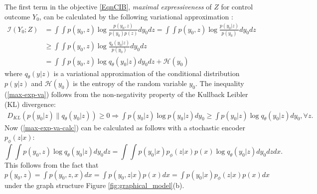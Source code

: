 \documentclass{article}
\begin{document}
    The first term in the objective \eqref{EqnCIB}, \textit{maximal expressiveness} of $ Z $ for control outcome $ Y_0 $, can be calculated by the following variational approximation \cite{Alemi17}:
    \begin{align}
        \mathcal{I}(Y_0; Z)&= \displaystyle\int\int p(y_0,z) \log \frac{p(y_0,z)}{p(y_0)p(z)} dy_0dz = \displaystyle\int\int p(y_0,z) \log \frac{p(y_0|z)}{p(y_0)} dy_0dz \nonumber\\
        &\ge \displaystyle\int\int p(y_0,z) \log \frac{q_{\theta}(y_0|z)}{p(y_0)} dy_0dz\label{max-exp-va}\\
        &= \displaystyle\int\int p(y_0,z) \log q_{\theta}(y_0|z) dy_0dz + \mathcal{H}(y_0) \label{max-exp-va-calc}
    \end{align}
    where $q_{\theta}(y|z)$ is a variational approximation of the conditional distribution $p(y|z)$ and $\mathcal{H}(y_0)$ is the entropy of the random variable $y_0$. The inequality (\ref{max-exp-va}) follows from the non-negativity property of the Kullback Leibler (KL) divergence:
    \begin{align*}D_{KL}(p(y_0|z)\|q_{\theta}(y_0|z)) \ge 0 \Longrightarrow \displaystyle\int p(y_0|z) \log p(y_0|z)  dy_0 \ge \displaystyle\int  p(y_0|z) \log q_{\theta}(y_0|z) dy_0, \forall z.
    \end{align*}
    Now (\ref{max-exp-va-calc}) can be calculated as follows with a stochastic encoder $p_{\phi}(z|x)$:
    \begin{equation}\label{variational-information}
        \displaystyle\int\int p(y_0,z) \log q_{\theta}(y_0|z) dy_0dz = \displaystyle\int\int  p(y_0|x) p_{\phi}(z|x) p(x) \log q_{\theta}(y_0|z) dy_0dzdx.
    \end{equation}
    This follows from the fact that $p(y_0,z) = \int p(y_0, z, x) dx = \int p(y_0, z|x) p(x)dx = \int p(y_0|x)p_{\phi}(z|x) p(x) dx$ under the graph structure Figure \ref{fig:graphical_model}(b).  
    
\end{document}
